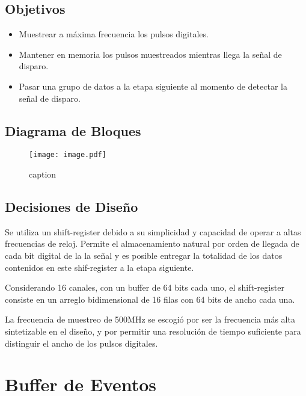 \subsection{Objetivos}
\begin{itemize}
	\item Muestrear a máxima frecuencia los pulsos digitales.
	\item Mantener en memoria los pulsos muestreados mientras llega la señal de disparo.
	\item Pasar una grupo de datos a la etapa siguiente al momento de detectar la señal de disparo.
\end{itemize}

\subsection{Diagrama de Bloques}

\begin{figure}[H]
	\centering
	\texttt{[image: image.pdf]}
	\caption{caption}
	\label{fig:}
\end{figure}

\subsection{Decisiones de Diseño}

Se utiliza un shift-register debido a su simplicidad y capacidad de operar a altas frecuencias de reloj. Permite el almacenamiento natural por orden de llegada de cada bit digital de la la señal y es posible entregar la totalidad de los datos contenidos en este shif-register a la etapa siguiente.

Considerando 16 canales, con un buffer de 64 bits cada uno, el shift-register consiste en un arreglo bidimensional de 16 filas con 64 bits de ancho cada una.

La frecuencia de muestreo de 500MHz se escogió por ser la frecuencia más alta sintetizable en el diseño, y por permitir una resolución de tiempo suficiente para distinguir el ancho de los pulsos digitales.


\section{Buffer de Eventos}
\label{sec:buffer}

